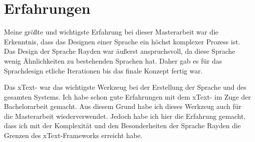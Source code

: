 \section{Erfahrungen}

Meine größte und wichtigste Erfahrung bei dieser Masterarbeit war die Erkenntnis, dass das Designen einer Sprache ein höchst komplexer Prozess ist. Das Design der Sprache Rayden war äußerst anspruchsvoll, da diese Sprache wenig Ähnlichkeiten zu bestehenden Sprachen hat. Daher gab es für das Sprachdesign etliche Iterationen bis das finale Konzept fertig war.

\SuperPar
Das xText- war das wichtigste Werkzeug bei der Erstellung der Sprache und des gesamten Systems. Ich habe schon gute Erfahrungen mit dem xText- im Zuge der Bachelorarbeit gemacht. Aus diesem Grund habe ich dieses Werkzeug auch für die Masterarbeit wiederverwendet. Jedoch habe ich hier die Erfahrung gemacht, dass ich mit der Komplexität und den Besonderheiten der Sprache Rayden die Grenzen des xText-Frameworks erreicht habe.
